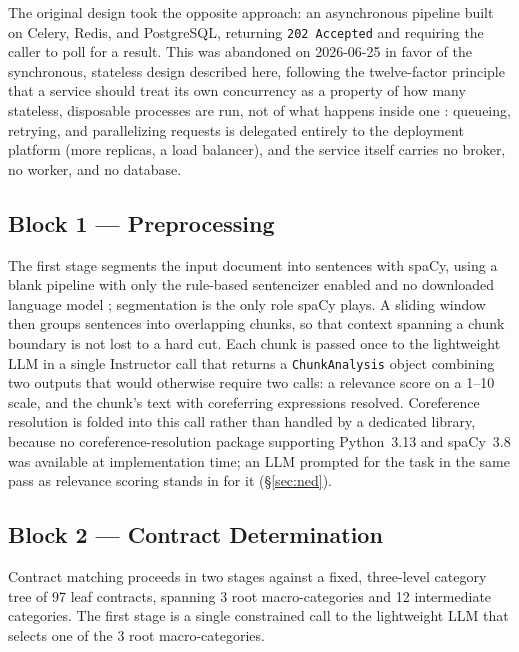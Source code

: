 The original design took the opposite approach: an asynchronous pipeline built on Celery, Redis, and PostgreSQL, returning \texttt{202 Accepted} and requiring the caller to poll for a result. This was abandoned on 2026-06-25 in favor of the synchronous, stateless design described here, following the twelve-factor principle that a service should treat its own concurrency as a property of how many stateless, disposable processes are run, not of what happens inside one \citep{wiggins2011twelve,fowler2014microservices,newman2015building}: queueing, retrying, and parallelizing requests is delegated entirely to the deployment platform (more replicas, a load balancer), and the service itself carries no broker, no worker, and no database.

\subsection{Block 1 --- Preprocessing}
\label{sec:bulk-insert-block1}

The first stage segments the input document into sentences with spaCy, using a blank pipeline with only the rule-based sentencizer enabled and no downloaded language model \citep{honnibal2026spacy}; segmentation is the only role spaCy plays. A sliding window then groups sentences into overlapping chunks, so that context spanning a chunk boundary is not lost to a hard cut. Each chunk is passed once to the lightweight LLM in a single Instructor call that returns a \texttt{ChunkAnalysis} object combining two outputs that would otherwise require two calls: a relevance score on a 1--10 scale, and the chunk's text with coreferring expressions resolved. Coreference resolution is folded into this call rather than handled by a dedicated library, because no coreference-resolution package supporting Python~3.13 and spaCy~3.8 was available at implementation time; an LLM prompted for the task in the same pass as relevance scoring stands in for it (\S\ref{sec:ned}).

\subsection{Block 2 --- Contract Determination}
\label{sec:bulk-insert-block2}

Contract matching proceeds in two stages against a fixed, three-level category tree of 97 leaf contracts, spanning 3 root macro-categories and 12 intermediate categories. The first stage is a single constrained call to the lightweight LLM that selects one of the 3 root macro-categories. 

